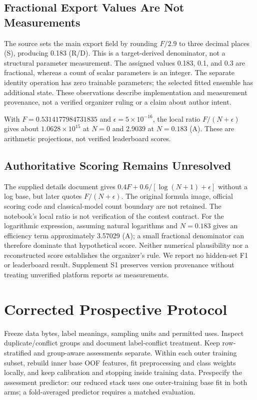 \documentclass[doublecolumn]{ijcvsplatex}
\begin{document}
\subsection{Fractional Export Values Are Not Measurements}
The source sets the main export field by rounding $F/2.9$ to three decimal places (S), producing 0.183 (R/D).
This is a target-derived denominator, not a structural parameter measurement. The assigned values 0.183, 0.1, and 0.3 are fractional, whereas a count of scalar parameters is an integer. The separate identity operation has zero trainable parameters; the selected fitted ensemble has additional state. These observations describe implementation and measurement provenance, not a verified organizer ruling or a claim about author intent.

With $F=0.5314177984731835$ and $\epsilon=5\times10^{-16}$, the local ratio $F/(N+\epsilon)$ gives about $1.0628\times10^{15}$ at $N=0$ and 2.9039 at $N=0.183$ (A). These are arithmetic projections, not verified leaderboard scores.

\subsection{Authoritative Scoring Remains Unresolved}
The supplied details document gives $0.4F+0.6/[\log(N+1)+\epsilon]$ without a log base, but later quotes $F/(N+\epsilon)$. The original formula image, official scoring code and classical-model count boundary are not retained. The notebook's local ratio is not verification of the contest contract. For the logarithmic expression, assuming natural logarithms and $N=0.183$ gives an efficiency term approximately 3.57029 (A); a small fractional denominator can therefore dominate that hypothetical score. Neither numerical plausibility nor a reconstructed score establishes the organizer's rule. We report no hidden-set F1 or leaderboard result. Supplement S1 preserves version provenance without treating unverified platform reports as measurements.

\section{Corrected Prospective Protocol}
\label{sec:discussion}
Freeze data bytes, label meanings, sampling units and permitted uses. Inspect duplicate/conflict groups and document label-conflict treatment. Keep row-stratified and group-aware assessments separate. Within each outer training subset, rebuild inner base OOF features, fit preprocessing and class weights locally, and keep calibration and stopping inside training data. Prespecify the assessment predictor: our reduced stack uses one outer-training base fit in both arms; a fold-averaged predictor requires a matched evaluation.
\end{document}
